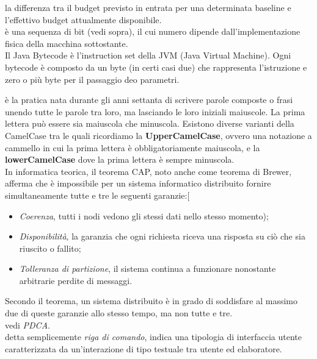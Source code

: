 \documentclass{scalatekids-article}
\begin{document}
 la differenza tra il budget previsto in entrata per una determinata baseline e l'effettivo budget attualmente disponibile.
\\

 è una sequenza di bit (vedi sopra), il cui numero dipende dall'implementazione fisica della macchina sottostante.
\\

 Il Java Bytecode è l'instruction set della JVM (Java Virtual Machine). Ogni bytecode è composto da un byte (in certi casi due) che rappresenta l'istruzione e zero o più byte per il passaggio deo parametri. 
\\


 è la pratica nata durante gli anni settanta di scrivere parole composte o frasi unendo tutte le parole tra loro, ma lasciando le loro iniziali maiuscole. La prima lettera può essere sia maiuscola che minuscola.
Esistono diverse varianti della CamelCase tra le quali ricordiamo la \textbf{UpperCamelCase}, ovvero una notazione a cammello in cui la prima lettera è obbligatoriamente maiuscola, e la \textbf{lowerCamelCase} dove la prima lettera è sempre minuscola.
\\

 In informatica teorica, il teorema CAP, noto anche come teorema di Brewer, afferma che è impossibile per un sistema informatico distribuito fornire simultaneamente tutte e tre le seguenti garanzie:[
\begin{itemize}
	\item \textit{Coerenza}, tutti i nodi vedono gli stessi dati nello stesso momento);
	\item \textit{Disponibilità}, la garanzia che ogni richiesta riceva una risposta su ciò che sia riuscito o fallito;
	\item \textit{Tolleranza di partizione}, il sistema continua a funzionare nonostante arbitrarie perdite di messaggi.
\end{itemize}
Secondo il teorema, un sistema distribuito è in grado di soddisfare al massimo due di queste garanzie allo stesso tempo, ma non tutte e tre.
\\

 vedi \textit{PDCA}.
\\

 detta semplicemente \textit{riga di comando}, indica una tipologia di interfaccia utente caratterizzata da un'interazione di tipo testuale tra utente ed elaboratore.
\\
\end{document}

